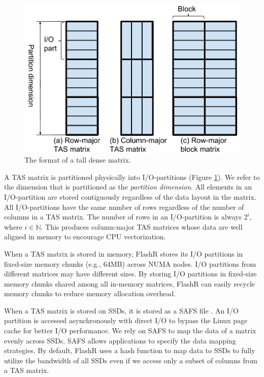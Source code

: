 \begin{figure}
	\centering
	\includegraphics[scale=0.5]{FlashMatrix_figs/dense_matrix2.pdf}
	\vspace{-5pt}
	\caption{The format of a tall dense matrix.}
	\label{fig:den_mat}
  \vspace{-12pt}
\end{figure}

A TAS matrix is partitioned physically into I/O-partitions (Figure
\ref{fig:den_mat}). We refer to the dimension that is partitioned as
the \textit{partition dimension}. All elements in an I/O-partition are stored
contiguously regardless of the data layout in the matrix. All I/O-partitions
have the same number of rows regardless of the number of columns in a TAS
matrix. The number of rows in an I/O-partition is always $2^i$, where
$i \in \mathbb{N}$. This produces column-major TAS
matrices whose data are well aligned in memory to encourage CPU vectorization.

When a TAS matrix is stored in memory, FlashR stores its I/O partitions in
fixed-size memory chunks (e.g., 64MB) across NUMA nodes.
I/O partitions from different matrices may have different sizes. By storing
I/O partitions in fixed-size memory chunks shared among all in-memory matrices,
FlashR can easily recycle memory chunks to reduce memory allocation overhead.

When a TAS matrix is stored on SSDs, it is stored as a SAFS file \cite{safs}.
An I/O partition is accessed asynchronously with direct I/O to bypass the Linux
page cache for better I/O performance.
We rely on SAFS to map the data of a matrix evenly across SSDs. SAFS allows
applications to specify the data mapping strategies. By default, FlashR uses
a hash function to map data to SSDs to fully utilize the bandwidth of all SSDs
even if we access only a subset of columns from a TAS matrix.

